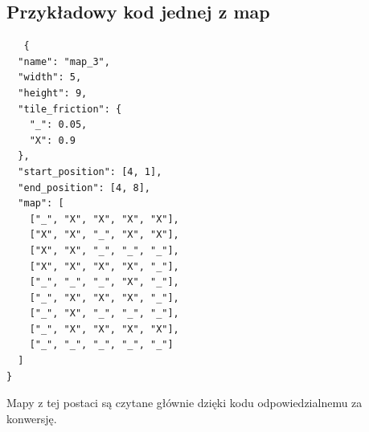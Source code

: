 \documentclass{article}
\begin{document}
\subsection{Przykładowy kod jednej z map}
\begin{verbatim}
   {
  "name": "map_3",
  "width": 5,
  "height": 9,
  "tile_friction": {
    "_": 0.05,
    "X": 0.9
  },
  "start_position": [4, 1],
  "end_position": [4, 8],
  "map": [
    ["_", "X", "X", "X", "X"],
    ["X", "X", "_", "X", "X"],
    ["X", "X", "_", "_", "_"],
    ["X", "X", "X", "X", "_"],
    ["_", "_", "_", "X", "_"],
    ["_", "X", "X", "X", "_"],
    ["_", "X", "_", "_", "_"],
    ["_", "X", "X", "X", "X"],
    ["_", "_", "_", "_", "_"]
  ]
}

\end{verbatim}
Mapy z tej postaci są czytane głównie dzięki kodu odpowiedzialnemu za konwersję.
\end{document}
